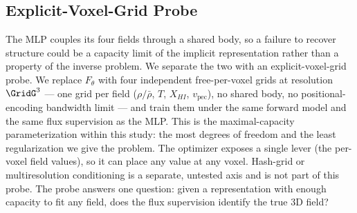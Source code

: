 \subsection{Explicit-Voxel-Grid Probe}
\label{sec:method:gridprobe}
The MLP couples its four fields through a shared body, so a failure to recover structure could be a capacity limit of the implicit representation rather than a property of the inverse problem. We separate the two with an explicit-voxel-grid probe. We replace $F_\theta$ with four independent free-per-voxel grids at resolution $\GridG^3$ --- one grid per field ($\rho/\bar\rho$, $T$, $X_{HI}$, $v_{\text{pec}}$), no shared body, no positional-encoding bandwidth limit --- and train them under the same forward model and the same flux supervision as the MLP. This is the maximal-capacity parameterization within this study: the most degrees of freedom and the least regularization we give the problem. The optimizer exposes a single lever (the per-voxel field values), so it can place any value at any voxel. Hash-grid or multiresolution conditioning is a separate, untested axis and is not part of this probe. The probe answers one question: given a representation with enough capacity to fit any field, does the flux supervision identify the true 3D field?
